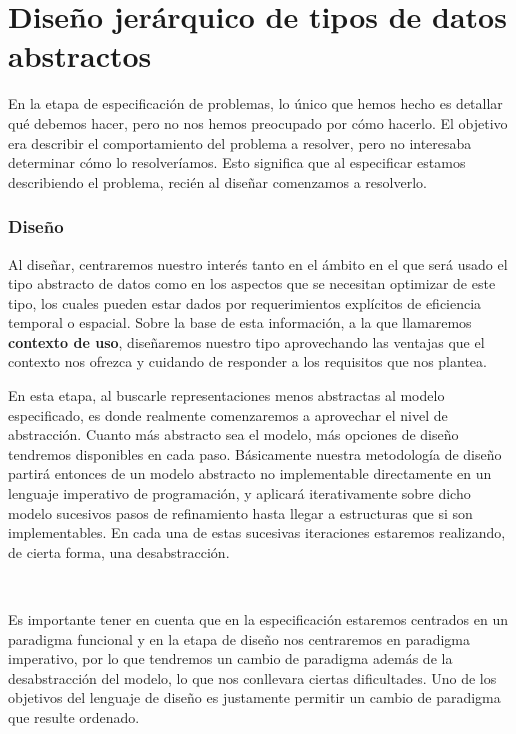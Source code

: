 \chapter{Dise\~no jer\'arquico de tipos de datos abstractos}

En la etapa de especificaci\'on de problemas, lo \'unico que hemos hecho es detallar qu\'e debemos hacer, pero no nos hemos preocupado por c\'omo hacerlo. El objetivo era describir el comportamiento del problema a resolver, pero no interesaba determinar c\'omo lo resolver\'iamos. Esto significa que al especificar estamos describiendo el problema, reci\'en al dise\~nar comenzamos a resolverlo.

\subsection{Dise\~no}

Al dise\~nar, centraremos nuestro inter\'es tanto en el \'ambito en el que ser\'a usado el tipo abstracto de datos como en los aspectos que se necesitan optimizar de este tipo, los cuales pueden estar dados por requerimientos expl\'icitos de eficiencia temporal o espacial. Sobre la base de esta informaci\'on, a la que llamaremos \textbf{contexto de uso}, dise\~naremos nuestro tipo aprovechando las ventajas que el contexto nos ofrezca y cuidando de responder a los requisitos que nos plantea.

En esta etapa, al buscarle representaciones menos abstractas al modelo especificado, es donde realmente comenzaremos a aprovechar el nivel de abstracci\'on. Cuanto m\'as abstracto sea el modelo, m\'as opciones de dise\~no tendremos disponibles en cada paso. B\'asicamente nuestra metodolog\'ia de dise\~no partir\'a entonces de un modelo abstracto no implementable directamente en un lenguaje imperativo de programaci\'on, y aplicar\'a iterativamente sobre dicho modelo sucesivos pasos de refinamiento hasta llegar a estructuras que si son implementables. En cada una de estas sucesivas iteraciones estaremos realizando, de cierta forma, una desabstracci\'on.

~

Es importante tener en cuenta que en la especificaci\'on estaremos centrados en un paradigma funcional y en la etapa de dise\~no nos centraremos en paradigma imperativo, por lo que tendremos un cambio de paradigma adem\'as de la desabstracci\'on del modelo, lo que nos conllevara ciertas dificultades. Uno de los objetivos del lenguaje de dise\~no es justamente permitir un cambio de paradigma que resulte ordenado.


